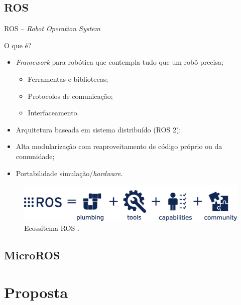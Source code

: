 \documentclass{if-beamer}
\begin{document}
\subsection*{ROS}

\begin{frame}{ROS -- \textit{Robot Operation System}}
	
	\begin{block}{O que é?}
		\begin{itemize}
			\item \textit{Framework} para robótica que contempla tudo que um robô precisa;
			\begin{itemize}
				\item Ferramentas e bibliotecas;
				\item Protocolos de comunicação;
				\item Interfaceamento.
				
			\end{itemize}
			\item Arquitetura baseada em sistema distribuído (ROS 2);
			\item Alta modularização com reaproveitamento de código próprio ou da comunidade;
			\item Portabilidade simulação/\textit{hardware}.
		\end{itemize}
	\end{block}
	
	
\begin{figure}
	\centering
	\includegraphics[width=1\linewidth]{img/ros-equation.png}
	\caption{Ecossitema ROS \cite{ecoros}.}
	\label{fig:ros-equation}
\end{figure}
	
\end{frame}


\subsection*{MicroROS}



\section{Proposta}
\end{document}
